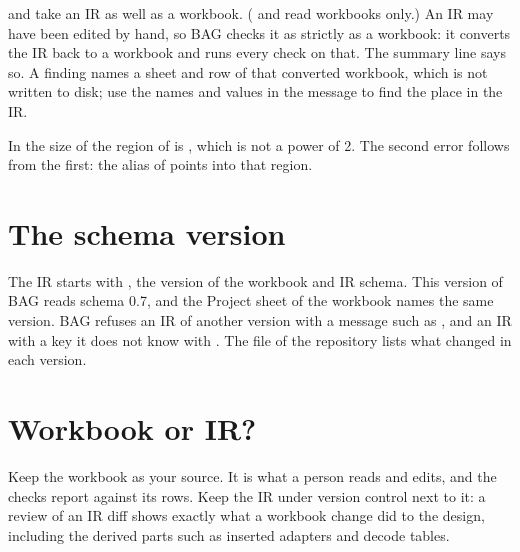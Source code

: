  and  take an IR as well as a workbook. (
and  read workbooks only.) An IR may have been edited by hand, so BAG checks
it as strictly as a workbook: it converts the IR back to a workbook and runs every check
on that. The summary line says so. A finding names a sheet and row of that converted
workbook, which is not written to disk; use the names and values in the message to find
the place in the IR.



In  the size of the region  of  is
, which is not a power of 2. The second error follows from the first:
the alias of  points into that region.

\section{The schema version}

The IR starts with , the version of the workbook and IR schema. This
version of BAG reads schema 0.7, and the Project sheet of the workbook names the same
version. BAG refuses an IR of another version with a message such as
, and an IR with a key it
does not know with . The file  of the repository lists what
changed in each version.

\section{Workbook or IR?}

Keep the workbook as your source. It is what a person reads and edits, and the checks
report against its rows. Keep the IR under version control next to it: a review of an
IR diff shows exactly what a workbook change did to the design, including the derived
parts such as inserted adapters and decode tables.
